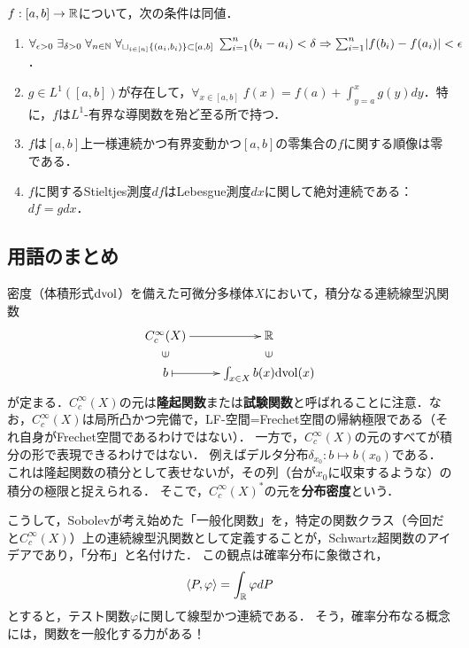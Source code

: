 \documentclass[uplatex,dvipdfmx]{jsreport}
\begin{document}
\begin{theorem}[絶対連続性の復習]\label{thm-absolutely-continuous}
    $f:[a,b]\to\mathbb{R}$について，次の条件は同値．
    \begin{enumerate}
        \item $\forall_{\epsilon>0}\;\exists_{\delta>0}\;\forall_{n\in\mathbb{N}}\;\forall_{\sqcup_{i\in[n]}\{(a_i,b_i)\}\subset[a,b]}\;\sum^n_{i=1}(b_i-a_i)<\delta\Rightarrow\sum^n_{i=1}\lvert f(b_i)-f(a_i)\rvert<\epsilon$．
        \item $g\in L^1([a,b])$が存在して，$\forall_{x\in[a,b]}\;f(x)=f(a)+\int_{y=a}^xg(y)dy$．特に，$f$は$L^1$-有界な導関数を殆ど至る所で持つ．
        \item $f$は$[a,b]$上一様連続かつ有界変動かつ$[a,b]$の零集合の$f$に関する順像は零である．
        \item $f$に関するStieltjes測度$df$はLebesgue測度$dx$に関して絶対連続である：$df=gdx$．
    \end{enumerate}
\end{theorem}

\subsection{用語のまとめ}

\begin{discussion}
    密度（体積形式$\mathrm{dvol}$）を備えた可微分多様体$X$において，積分なる連続線型汎関数
    \[\xymatrix@R-2pc{
        C^\infty_c(X)\ar[r]&\R\\
        \rotatebox[origin=c]{90}{$\in$}&\rotatebox[origin=c]{90}{$\in$}\\
        b\ar@{|->}[r]&\int_{x\in X}b(x)\dvol(x)
    }\]
    が定まる．$C_c^\infty(X)$の元は\textbf{隆起関数}または\textbf{試験関数}と呼ばれることに注意．なお，$C_c^\infty(X)$は局所凸かつ完備で，LF-空間=Frechet空間の帰納極限である（それ自身がFrechet空間であるわけではない）．
    一方で，$C_c^\infty(X)$の元のすべてが積分の形で表現できるわけではない．
    例えばデルタ分布$\delta_{x_0}:b\mapsto b(x_0)$である．
    これは隆起関数の積分として表せないが，その列（台が$x_0$に収束するような）の積分の極限と捉えられる．
    そこで，$C_c^\infty(X)^*$の元を\textbf{分布密度}という．
\end{discussion}
\begin{remarks}
    こうして，Sobolevが考え始めた「一般化関数」を，特定の関数クラス（今回だと$C_c^\infty(X)$）上の連続線型汎関数として定義することが，Schwartz超関数のアイデアであり，「分布」と名付けた．
    この観点は確率分布に象徴され，
    \[\langle P,\varphi\rangle=\int_{\mathbb{R}}\varphi dP\]
    とすると，テスト関数$\varphi$に関して線型かつ連続である．
    そう，確率分布なる概念には，関数を一般化する力がある！
\end{remarks}
\end{document}
